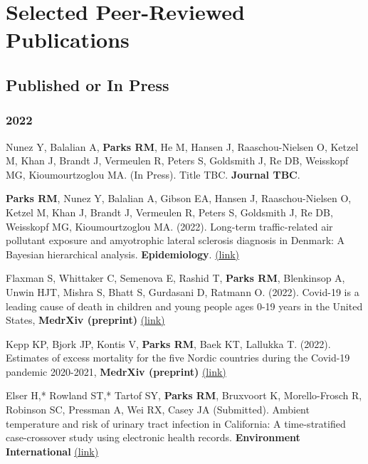 \section*{Selected Peer-Reviewed Publications}

\subsection*{Published or In Press}

\subsubsection*{2022}

\noindent Nunez Y, Balalian A, \textbf{Parks RM}, He M, Hansen J, Raaschou-Nielsen O, Ketzel M, Khan J, Brandt J, Vermeulen R, Peters S, Goldsmith J, Re DB, Weisskopf MG, Kioumourtzoglou MA. (In Press). Title TBC. \textbf{Journal TBC}. \bigskip

\noindent \textbf{Parks RM}, Nunez Y, Balalian A,  Gibson EA, Hansen J, Raaschou-Nielsen O, Ketzel M, Khan J, Brandt J, Vermeulen R, Peters S, Goldsmith J, Re DB, Weisskopf MG, Kioumourtzoglou MA. (2022). Long-term traffic-related air pollutant exposure and amyotrophic lateral sclerosis diagnosis in Denmark: A Bayesian hierarchical analysis. \textbf{Epidemiology}. \href{https://journals.lww.com/epidem/Abstract/9900/Long_term_traffic_related_air_pollutant_exposure.55.aspx}{(link)} \bigskip

\noindent Flaxman S, Whittaker C, Semenova E, Rashid T, \textbf{Parks RM}, Blenkinsop A, Unwin HJT, Mishra S, Bhatt S, Gurdasani D, Ratmann O. (2022). Covid-19 is a leading cause of death in children and young people ages 0-19 years in the United States, \textbf{MedrXiv (preprint)} \href{https://www.medrxiv.org/content/10.1101/2022.05.23.22275458v3}{(link)} \bigskip

\noindent Kepp KP, Bjork JP, Kontis V, \textbf{Parks RM}, Baek KT, Lallukka T. (2022). Estimates of excess mortality for the five Nordic countries during the Covid-19 pandemic 2020-2021, \textbf{MedrXiv (preprint)} \href{https://www.medrxiv.org/content/10.1101/2022.05.07.22274789v2}{(link)} \bigskip

\noindent Elser H,* Rowland ST,* Tartof SY, \textbf{Parks RM}, Bruxvoort K, Morello-Frosch R, Robinson SC, Pressman A, Wei RX, Casey JA (Submitted). Ambient temperature and risk of urinary tract infection in California: A time-stratified case-crossover study using electronic health records. \textbf{Environment International} \href{https://www.sciencedirect.com/science/article/pii/S0160412022002306}{(link)} \bigskip

